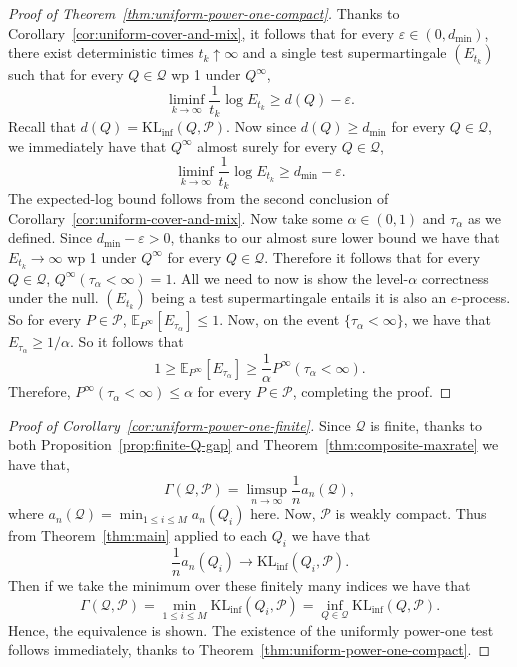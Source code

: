\documentclass[11pt]{article}
\newcommand{\KLinf}{\mathrm{KL}_{\mathrm{inf}}}
\newcommand{\E}{\mathbb{E}}
\newcommand{\Pcal}{\mathcal{P}}
\newcommand{\Qcal}{\mathcal{Q}}
\theoremstyle{definition}
\theoremstyle{definition}
\begin{document}
\begin{proof}[Proof of Theorem~\ref{thm:uniform-power-one-compact}]
Thanks to Corollary~\ref{cor:uniform-cover-and-mix}, it follows that for every $\varepsilon\in (0,d_{\mathrm{min}})$, there exist deterministic times $t_k\uparrow \infty$ and a single test supermartingale $(E_{t_k})$ such that for every $Q\in\Qcal$ wp 1 under $Q^{\infty}$,
\[
\liminf_{k\to\infty}\frac{1}{t_k}\log E_{t_k}\ge d(Q)-\varepsilon.
\]
Recall that $d(Q)=\KLinf(Q,\Pcal)$. Now since $d(Q)\ge d_{\mathrm{min}}$ for every $Q\in\Qcal$, we immediately have that $Q^{\infty}$ almost surely for every $Q\in\Qcal$,
\[
\liminf_{k\to\infty}\frac{1}{t_k}\log E_{t_k} \ge d_{\min}-\varepsilon.
\]
The expected-log bound follows from the second conclusion of Corollary~\ref{cor:uniform-cover-and-mix}. Now take some $\alpha\in(0,1)$ and $\tau_\alpha$ as we defined. Since $d_{\mathrm{min}}-\varepsilon>0$, thanks to our almost sure lower bound we have that $E_{t_k}\to\infty$ wp 1 under $Q^{\infty}$ for every $Q\in\Qcal$. Therefore it follows that for every $Q\in\Qcal$, $Q^{\infty}(\tau_\alpha<\infty)=1$. All we need to now is show the level-$\alpha$ correctness under the null. $(E_{t_k})$ being a test supermartingale entails it is also an $e$-process. So for every $P\in\Pcal$, $\E_{P^\infty}[E_{\tau_\alpha}]\le 1$. Now, on the event $\{\tau_\alpha < \infty\}$, we have that $E_{\tau_\alpha}\ge 1/\alpha$. So it follows that
\[
1\ge \E_{P^\infty}[E_{\tau_\alpha}]
\ge \frac{1}{\alpha}P^\infty(\tau_\alpha<\infty).
\]
Therefore, $P^{\infty}(\tau_\alpha<\infty)\le \alpha$ for every $P\in\Pcal$, completing the proof.
\end{proof}

\begin{proof}[Proof of Corollary~\ref{cor:uniform-power-one-finite}]
Since $\Qcal$ is finite, thanks to both Proposition~\ref{prop:finite-Q-gap} and Theorem~\ref{thm:composite-maxrate} we have that,
\[
\Gamma(\Qcal,\Pcal)=\limsup_{n\to\infty}\frac1n a_n(\Qcal),
\]
where $a_n(\Qcal)=\min_{1\le i\le M} a_n(Q_i)$ here. Now, $\Pcal$ is weakly compact. Thus from Theorem~\ref{thm:main} applied to each $Q_i$ we have that
\[
\frac{1}{n}a_n(Q_i)\longrightarrow \KLinf(Q_i,\Pcal).
\]
Then if we take the minimum over these finitely many indices we have that
\[
\Gamma(\Qcal,\Pcal)=\min_{1\le i\le M}\KLinf(Q_i,\Pcal) =\inf_{Q\in\Qcal}\KLinf(Q,\Pcal).
\]
Hence, the equivalence is shown. The existence of the uniformly power-one test follows immediately, thanks to Theorem~\ref{thm:uniform-power-one-compact}.
\end{proof}
\end{document}

